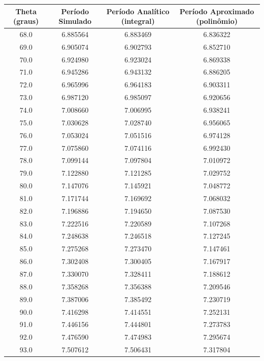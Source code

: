 \documentclass[12pt,a4paper]{article}
\begin{document}
\begin{table}[H]
\begin{center}
\begin{tabular}{|c|c|c|c|}
\hline
Theta (graus) & Período Simulado & Período Analítico (integral) & Período Aproximado (polinômio) \\
\hline
68.0 & 6.885564 & 6.883469 & 6.836322 \\
\hline
69.0 & 6.905074 & 6.902793 & 6.852710 \\
\hline
70.0 & 6.924980 & 6.923024 & 6.869338 \\
\hline
71.0 & 6.945286 & 6.943132 & 6.886205 \\
\hline
72.0 & 6.965996 & 6.964183 & 6.903311 \\
\hline
73.0 & 6.987120 & 6.985097 & 6.920656 \\
\hline
74.0 & 7.008660 & 7.006995 & 6.938241 \\
\hline
75.0 & 7.030628 & 7.028740 & 6.956065 \\
\hline
76.0 & 7.053024 & 7.051516 & 6.974128 \\
\hline
77.0 & 7.075860 & 7.074116 & 6.992430 \\
\hline
78.0 & 7.099144 & 7.097804 & 7.010972 \\
\hline
79.0 & 7.122880 & 7.121285 & 7.029752 \\
\hline
80.0 & 7.147076 & 7.145921 & 7.048772 \\
\hline
81.0 & 7.171744 & 7.169692 & 7.068032 \\
\hline
82.0 & 7.196886 & 7.194650 & 7.087530 \\
\hline
83.0 & 7.222516 & 7.220589 & 7.107268 \\
\hline
84.0 & 7.248638 & 7.246518 & 7.127245 \\
\hline
85.0 & 7.275268 & 7.273470 & 7.147461 \\
\hline
86.0 & 7.302408 & 7.300405 & 7.167917 \\
\hline
87.0 & 7.330070 & 7.328411 & 7.188612 \\
\hline
88.0 & 7.358268 & 7.356388 & 7.209546 \\
\hline
89.0 & 7.387006 & 7.385492 & 7.230719 \\
\hline
90.0 & 7.416298 & 7.414551 & 7.252131 \\
\hline
91.0 & 7.446156 & 7.444801 & 7.273783 \\
\hline
92.0 & 7.476590 & 7.474983 & 7.295674 \\
\hline
93.0 & 7.507612 & 7.506431 & 7.317804 \\

\end{tabular}
\end{center}
\end{table}
\end{document}
